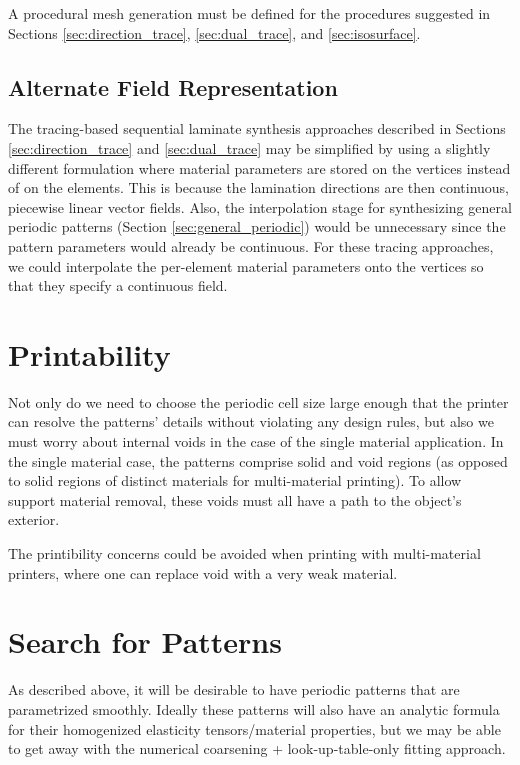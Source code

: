 \documentclass[10pt]{article}
\begin{document}
A procedural mesh generation must be defined for the procedures suggested
in Sections \ref{sec:direction_trace}, \ref{sec:dual_trace}, and
\ref{sec:isosurface}.

\subsection{Alternate Field Representation}
The tracing-based sequential laminate synthesis approaches
described in Sections \ref{sec:direction_trace} and \ref{sec:dual_trace} may be
simplified by using a slightly different formulation where material parameters
are stored on the vertices instead of on the elements. This is because the
lamination directions are then continuous, piecewise linear vector fields. Also,
the interpolation stage for synthesizing general periodic patterns (Section
\ref{sec:general_periodic}) would be unnecessary since the pattern parameters
would already be continuous. For these tracing approaches, we could interpolate
the per-element material parameters onto the vertices so that they specify a
continuous field.

\section{Printability}
Not only do we need to choose the periodic cell size large enough that the
printer can resolve the patterns' details without violating any design rules,
but also we must worry about internal voids in the case of the single material
application. In the single material case, the patterns comprise solid and void
regions (as opposed to solid regions of distinct materials for multi-material
printing). To allow support material removal, these voids must all have a path
to the object's exterior.

The printibility concerns could be avoided when printing with multi-material
printers, where one can replace void with a very weak material.

\section{Search for Patterns}
As described above, it will be desirable to have periodic patterns that are
parametrized smoothly. Ideally these patterns will also have an analytic formula
for their homogenized elasticity tensors/material properties,
but we may be able to get away with the numerical coarsening +
look-up-table-only fitting approach.
\end{document}
